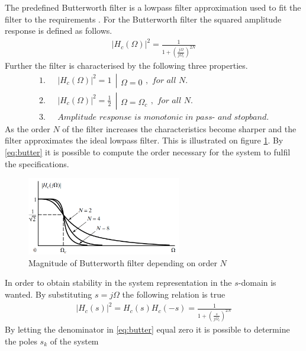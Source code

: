 The predefined Butterworth filter is a lowpass filter approximation used to fit the filter to the requirements . For the Butterworth filter the squared amplitude response is defined as follows.
\begin{align}\label{eq:butter}
|H_c(\Omega)|^2=\frac{1}{1+\left( \frac{j\Omega}{j\Omega_c}\right)^{2N}}
\end{align} 
Further the filter is characterised by the following three properties.
\begin{align}
1.& \ \ \ |H_c(\Omega)|^2 = 1 \  \ \left|\begin{matrix}
\\ 
\Omega=0
\end{matrix}\right. , \textit{ for all }N. \\
2.& \ \ \ |H_c(\Omega)|^2 = \frac{1}{2} \  \ \left|\begin{matrix}
\\ 
\Omega=\Omega_c
\end{matrix}\right. , \textit{ for all }N. \\
3.& \ \ \ \textit{Amplitude response is monotonic in pass- and stopband.}
\end{align}
As the order $N$ of the filter increases the characteristics become sharper and the filter approximates the ideal lowpass filter. This is illustrated on figure \ref{fig:butter}. By \eqref{eq:butter} it is possible to compute the order necessary for the system to fulfil the specifications.            
\begin{figure}[H]
    \centering
    \includegraphics[width = 0.6\textwidth]{figures/butterworth.png}
    \caption{Magnitude of Butterworth filter depending on order $N$ }
    \label{fig:butter}
\end{figure} 
In order to obtain stability in the system representation in the $s$-domain is wanted. By substituting $s=j\Omega$ the following relation is true
\begin{align}
|H_c(s)|^2 = H_c(s)H_c(-s)= \frac{1}{1+\left( \frac{s}{j\Omega_c}\right)^{2N}}
\end{align} 
By letting the denominator in \eqref{eq:butter} equal zero it is possible to determine the poles $s_k$ of the system
